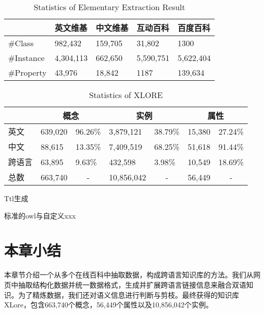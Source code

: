 \begin{table}[hb]
    \small
    \centering
    \caption{Statistics of Elementary Extraction Result}
    \label{tab:extract-result}
        \begin{tabular}{|p{2.5cm}|p{2cm}|p{2cm}|p{2cm}|p{2cm}|}
            \hline
                       & 英文维基    & 中文维基   & 互动百科    & 百度百科     \\ \hline
            \#Class    & 982,432   & 159,705  & 31,802    & 1300      \\ \hline
            \#Instance & 4,304,113 & 662,650  & 5,590,751 & 5,622,404 \\ \hline
            \#Property & 43,976    & 18,842   & 1187      & 139,634   \\ \hline
        \end{tabular}
\end{table}

\begin{table}[ht]
\small
\centering
\caption{Statistics of XLORE}
\label{tab:kb-result}
\begin{tabular}{|p{2cm}|p{1.5cm}|p{1.5cm}|p{1.5cm}|p{1.5cm}|p{1.5cm}|p{1.5cm}|}
\hline
\multicolumn{1}{|c|}{} & \multicolumn{2}{c|}{概念}     & \multicolumn{2}{c|}{实例}                   & \multicolumn{2}{c|}{属性}    \\ \hline
英文            & 639,020 & 96.26\%                & 3,879,121              & 38.79\%                & 15,380  & 27.24\%                \\ \hline
中文            & 88,615  & 13.35\%                & 7,409,519              & 68.25\%                & 51,618  & 91.44\%                \\ \hline
跨语言          & 63,895  & 9.63\%                 & 432,598                & 3.98\%                 & 10,549  & 18.69\%                \\ \hline
总数           & 663,740 & \multicolumn{1}{c|}{-} & 10,856,042             & \multicolumn{1}{c|}{-} & 56,449  & \multicolumn{1}{c|}{-} \\ \hline
\end{tabular}
\end{table}

Ttl生成

标准的owl与自定义xxx

\section{本章小结}
本章节介绍一个从多个在线百科中抽取数据，构成跨语言知识库的方法。我们从网页中抽取结构化数据并统一数据格式，生成并扩展跨语言链接信息来融合双语知识。为了精炼数据，我们还对语义信息进行判断与剪枝。最终获得的知识库XLore，包含663,740个概念，56,449个属性以及10,856,042个实例。

